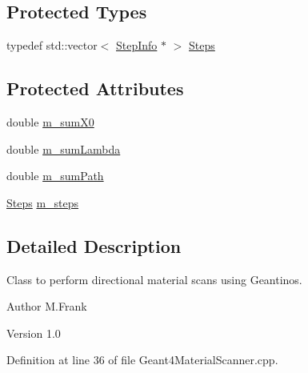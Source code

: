 \subsection*{Protected Types}
\begin{DoxyCompactItemize}
\item 
typedef std::vector$<$ \hyperlink{class_d_d4hep_1_1_simulation_1_1_geant4_material_scanner_1_1_step_info}{StepInfo} $\ast$ $>$ \hyperlink{class_d_d4hep_1_1_simulation_1_1_geant4_material_scanner_af5f8938342c8e56e7db11a372b8d4d9c}{Steps}
\end{DoxyCompactItemize}
\subsection*{Protected Attributes}
\begin{DoxyCompactItemize}
\item 
double \hyperlink{class_d_d4hep_1_1_simulation_1_1_geant4_material_scanner_aa34c1dce75b345ef9586ad6f0cc24382}{m\_\-sumX0}
\item 
double \hyperlink{class_d_d4hep_1_1_simulation_1_1_geant4_material_scanner_a0632ba964c16dfa195aef83134e51430}{m\_\-sumLambda}
\item 
double \hyperlink{class_d_d4hep_1_1_simulation_1_1_geant4_material_scanner_a2e04ec21c3f2d1800037e2dd427c8dc7}{m\_\-sumPath}
\item 
\hyperlink{class_d_d4hep_1_1_simulation_1_1_geant4_material_scanner_af5f8938342c8e56e7db11a372b8d4d9c}{Steps} \hyperlink{class_d_d4hep_1_1_simulation_1_1_geant4_material_scanner_aa8e97ed5d8812c6b4b4ceb0dce5f37d8}{m\_\-steps}
\end{DoxyCompactItemize}


\subsection{Detailed Description}
Class to perform directional material scans using Geantinos. \begin{DoxyAuthor}{Author}
M.Frank 
\end{DoxyAuthor}
\begin{DoxyVersion}{Version}
1.0 
\end{DoxyVersion}


Definition at line 36 of file Geant4MaterialScanner.cpp.


